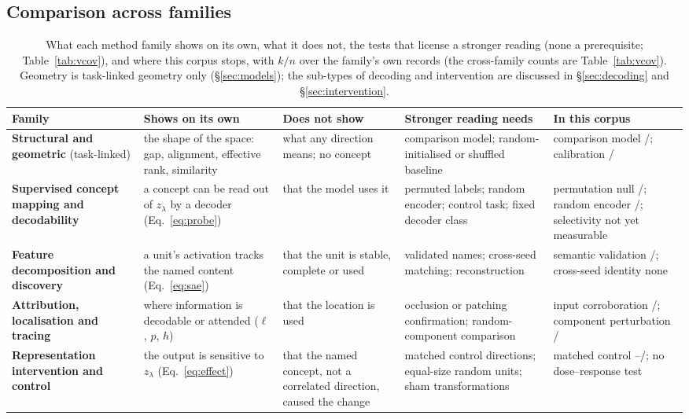 \subsection{Comparison across families}
\label{sec:comparison}

\begin{table}[!tb]
\centering\footnotesize\setlength\tabcolsep{4pt}\renewcommand{\arraystretch}{1.12}
\caption{What each method family shows on its own, what it does not, the tests that license a stronger
reading (none a prerequisite; Table~\ref{tab:vcov}), and where this corpus stops, with $k/n$ over the family's own records (the cross-family
counts are Table~\ref{tab:vcov}). Geometry is task-linked geometry only (\S\ref{sec:models}); the sub-types of decoding and intervention are discussed in \S\ref{sec:decoding} and \S\ref{sec:intervention}.}
\label{tab:families}
\begin{tabular}{@{}L{2.3cm}L{3.4cm}L{2.8cm}L{3.25cm}L{3.25cm}@{}}
\toprule
Family & Shows on its own & Does not show & Stronger reading needs & In this corpus \\
\midrule
\textbf{Structural and geometric} (task-linked) & the shape of the space: gap, alignment, effective rank, similarity & what any direction means; no concept & comparison model; random-initialised or shuffled baseline & comparison model \Vcomp{}/\Vcompn{}; calibration \Vncalgeo{}/\Vncalgeon{} \\
\addlinespace[3pt]
\textbf{Supervised concept mapping and decodability} & a concept can be read out of $z_\lambda$ by a decoder (Eq.~\ref{eq:probe}) & that the model uses it & permuted labels; random encoder; control task; fixed decoder class & permutation null \Vpermdec{}/\Vpermdecn{}; random encoder \Vlrndec{}/\Vlrndecn{}; selectivity not yet measurable \\
\addlinespace[3pt]
\textbf{Feature decomposition and discovery} & a unit's activation tracks the named content (Eq.~\ref{eq:sae}) & that the unit is stable, complete or used & validated names; cross-seed matching; reconstruction & semantic validation \Vsem{}/\Vsemn{}; cross-seed identity none \\
\addlinespace[3pt]
\textbf{Attribution, localisation and tracing} & where information is decodable or attended ($\ell$, $p$, $h$) & that the location is used & occlusion or patching confirmation; random-component comparison & input corroboration \Vinp{}/\Vinpn{}; component perturbation \Vinttr{}/\Vinttrn{} \\
\addlinespace[3pt]
\textbf{Representation intervention and control} & the output is sensitive to $z_\lambda$ (Eq.~\ref{eq:effect}) & that the named concept, not a correlated direction, caused the change & matched control directions; equal-size random units; sham transformations & matched control \Vspca{}--\Vspc{}/\Vspcn{}; no dose--response test \\

\end{tabular}
\end{table}
